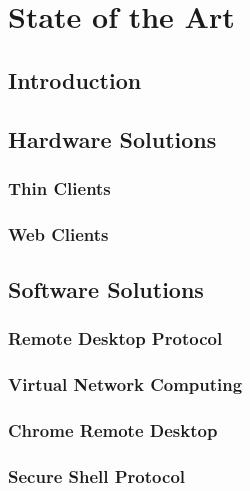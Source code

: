 \chapter{State of the Art} %

\label{Chapter3} %


\section{Introduction}

\todosection


\section{Hardware Solutions}

\todosection


\subsection{Thin Clients}

\todosection


\subsection{Web Clients}

\todosection


\section{Software Solutions}

\todosection


\subsection{Remote Desktop Protocol}

\todosection


\subsection{Virtual Network Computing}

\todosection


\subsection{Chrome Remote Desktop}

\todosection


\subsection{Secure Shell Protocol}

\todosection